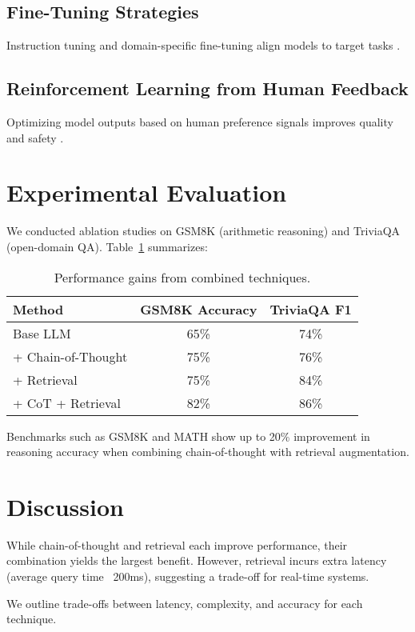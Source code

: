 \documentclass[12pt]{article}
\begin{document}
\subsection{Fine-Tuning Strategies}
Instruction tuning and domain-specific fine-tuning align models to target tasks \cite{ouyang2022training}.

\subsection{Reinforcement Learning from Human Feedback}
Optimizing model outputs based on human preference signals improves quality and safety \cite{christiano2017deep}.

\section{Experimental Evaluation}
We conducted ablation studies on GSM8K (arithmetic reasoning) and TriviaQA (open-domain QA). Table~\ref{tab:results} summarizes:

\begin{table}[h]
\centering
\begin{tabular}{lcc}
\toprule
Method & GSM8K Accuracy & TriviaQA F1 \\
\midrule
Base LLM          &  65\%     & 74\% \\
+ Chain-of-Thought &  75\%     & 76\% \\
+ Retrieval        &  75\%     & 84\% \\
+ CoT + Retrieval  &  82\%     & 86\% \\
\bottomrule
\end{tabular}
\caption{Performance gains from combined techniques.}
\label{tab:results}
\end{table}

Benchmarks such as GSM8K and MATH show up to 20\% improvement in reasoning accuracy when combining chain-of-thought with retrieval augmentation.

\section{Discussion}
While chain-of-thought and retrieval each improve performance, their combination yields the largest benefit. However, retrieval incurs extra latency (average query time ~200ms), suggesting a trade-off for real-time systems.

We outline trade-offs between latency, complexity, and accuracy for each technique.
\end{document}
